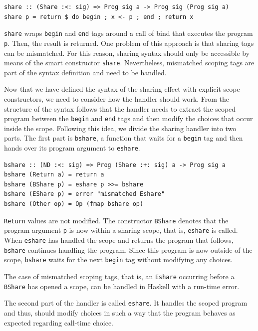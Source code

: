 \documentclass[a4paper, 11pt, fleqn, twoside, abstract=on]{scrreprt}
\newcommand{\hinl}[1]{\texttt{#1}}
\begin{document}
\begin{verbatim}
share :: (Share :<: sig) => Prog sig a -> Prog sig (Prog sig a)
share p = return $ do begin ; x <- p ; end ; return x
\end{verbatim}
\noindent
\hinl{share} wraps \hinl{begin} and \hinl{end} tags around a call of bind that executes the program \hinl{p}.
Then, the result is returned.
One problem of this approach is that sharing tags can be mismatched.
For this reason, sharing syntax should only be accessible by means of the smart constructor \hinl{share}.
Nevertheless, mismatched scoping tags are part of the syntax definition and need to be handled.

Now that we have defined the syntax of the sharing effect with explicit scope constructors, we need to consider how the handler should work.
From the structure of the syntax follows that the handler needs to extract the scoped program between the \hinl{begin} and \hinl{end} tags and then modify the choices that occur inside the scope.
Following this idea, we divide the sharing handler into two parts.
The first part is \hinl{bshare}, a function that waits for a \hinl{begin} tag and then hands over its program argument to \hinl{eshare}.
\pagebreak
\begin{verbatim}
bshare :: (ND :<: sig) => Prog (Share :+: sig) a -> Prog sig a
bshare (Return a) = return a
bshare (BShare p) = eshare p >>= bshare
bshare (EShare p) = error "mismatched Eshare"
bshare (Other op) = Op (fmap bshare op)
\end{verbatim}
\noindent
\hinl{Return} values are not modified.
The constructor \hinl{BShare} denotes that the program argument \hinl{p} is now within a sharing scope, that is, \hinl{eshare} is called.
When \hinl{eshare} has handled the scope and returns the program that follows, \hinl{bshare} continues handling the program.
Since this program is now outside of the scope, \hinl{bshare} waits for the next \hinl{begin} tag without modifying any choices.

The case of mismatched scoping tags, that is, an \hinl{Eshare} occurring before a \hinl{BShare} has opened a scope, can be handled in Haskell with a run-time error.

The second part of the handler is called \hinl{eshare}.
It handles the scoped program and thus, should modify choices in such a way that the program behaves as expected regarding call-time choice.
\end{document}
